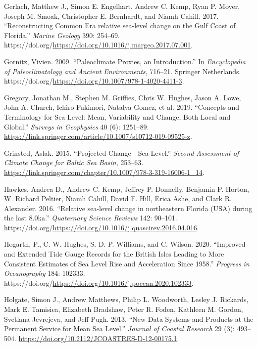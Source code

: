 \begin{CSLReferences}{1}{0}
\leavevmode{}%
Gerlach, Matthew J., Simon E. Engelhart, Andrew C. Kemp, Ryan P. Moyer, Joseph M. Smoak, Christopher E. Bernhardt, and Niamh Cahill. 2017. {``{Reconstructing Common Era relative sea-level change on the Gulf Coast of Florida}.''} \emph{Marine Geology} 390: 254--69. https://doi.org/\url{https://doi.org/10.1016/j.margeo.2017.07.001}.

\leavevmode{}%
Gornitz, Vivien. 2009. {``Paleoclimate Proxies, an Introduction.''} In \emph{Encyclopedia of Paleoclimatology and Ancient Environments}, 716--21. Springer Netherlands. https://doi.org/\url{https://doi.org/10.1007/978-1-4020-4411-3}.

\leavevmode{}%
Gregory, Jonathan M., Stephen M. Griffies, Chris W. Hughes, Jason A. Lowe, John A. Church, Ichiro Fukimori, Natalya Gomez, et al. 2019. {``{Concepts and Terminology for Sea Level: Mean, Variability and Change, Both Local and Global}.''} \emph{Surveys in Geophysics} 40 (6): 1251--89. \url{https://link.springer.com/article/10.1007/s10712-019-09525-z}.

\leavevmode{}%
Grinsted, Aslak. 2015. {``{Projected Change---Sea Level}.''} \emph{Second Assessment of Climate Change for Baltic Sea Basin}, 253--63. \url{https://link.springer.com/chapter/10.1007/978-3-319-16006-1_14}.

\leavevmode{}%
Hawkes, Andrea D., Andrew C. Kemp, Jeffrey P. Donnelly, Benjamin P. Horton, W. Richard Peltier, Niamh Cahill, David F. Hill, Erica Ashe, and Clark R. Alexander. 2016. {``{Relative sea-level change in northeastern Florida (USA) during the last 8.0ka}.''} \emph{Quaternary Science Reviews} 142: 90--101. https://doi.org/\url{https://doi.org/10.1016/j.quascirev.2016.04.016}.

\leavevmode{}%
Hogarth, P., C. W. Hughes, S. D. P. Williams, and C. Wilson. 2020. {``Improved and Extended Tide Gauge Records for the British Isles Leading to More Consistent Estimates of Sea Level Rise and Acceleration Since 1958.''} \emph{Progress in Oceanography} 184: 102333. https://doi.org/\url{https://doi.org/10.1016/j.pocean.2020.102333}.

\leavevmode{}%
Holgate, Simon J., Andrew Matthews, Philip L. Woodworth, Lesley J. Rickards, Mark E. Tamisiea, Elizabeth Bradshaw, Peter R. Foden, Kathleen M. Gordon, Svetlana Jevrejeva, and Jeff Pugh. 2013. {``{New Data Systems and Products at the Permanent Service for Mean Sea Level}.''} \emph{Journal of Coastal Research} 29 (3): 493--504. \url{https://doi.org/10.2112/JCOASTRES-D-12-00175.1}.


\end{CSLReferences}
